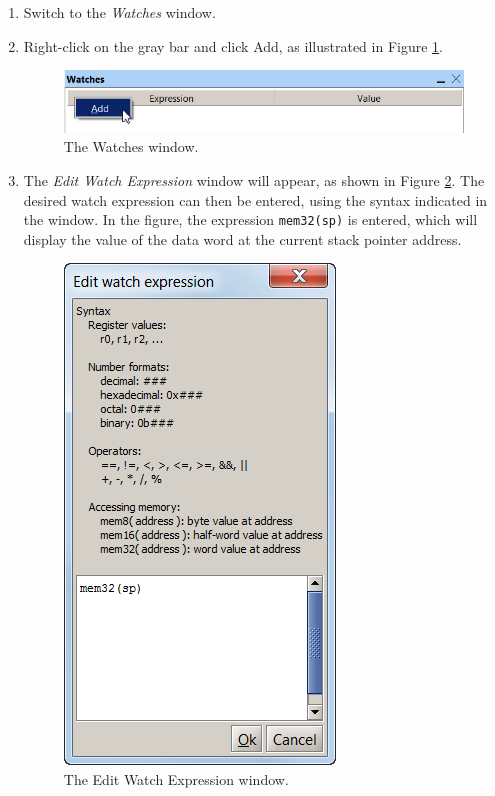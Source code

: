 \documentclass[11pt, twoside, pdftex]{article}
\begin{document}
\begin{enumerate}
\item Switch to the {\it Watches} window.

\item Right-click on the gray bar and click \textsf{Add},
as illustrated in Figure \ref{fig:AMP_watches}.

\begin{figure}[H]
   \begin{center}
      \includegraphics[scale=1]{screenshots/figure60.png}
   \end{center}
   \caption{The Watches window.}
   \label{fig:AMP_watches}
\end{figure}

\item The {\it Edit Watch Expression} window will appear, as
shown in Figure \ref{fig:AMP_editwatchexpression}. The desired watch expression can then be
entered, using the syntax indicated in the window. In the figure,
the expression \texttt{mem32(sp)} is entered, which will display
the value of the data word at the current stack pointer address.

\begin{figure}[H]
   \begin{center}
      \includegraphics[scale=1]{screenshots/figure61.png}
   \end{center}
   \caption{The Edit Watch Expression window.}
   \label{fig:AMP_editwatchexpression}
\end{figure}


\end{enumerate}
\end{document}
